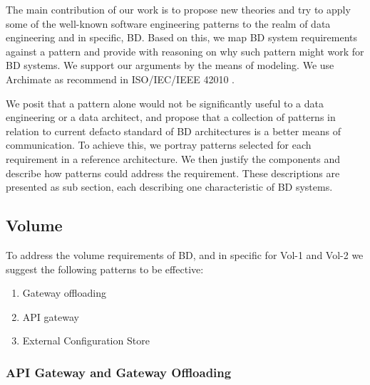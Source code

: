 \documentclass{bmcart}
\begin{document}
The main contribution of our work is to propose new theories and try to apply some of the well-known software engineering patterns to the realm of data engineering and in specific, BD. Based on this, we map BD system requirements against a pattern and provide with reasoning on why such pattern might work for BD systems. We support our arguments by the means of modeling. We use Archimate \cite{lankhorst2013language} as recommend in ISO/IEC/IEEE 42010 \cite{Chaabane}. 


We posit that a pattern alone would not be significantly useful to a data engineering or a data architect, and propose that a collection of patterns in relation to current defacto standard of BD architectures is a better means of communication. To achieve this, we portray patterns selected for each requirement in a reference architecture. We then justify the components and describe how patterns could address the requirement. These descriptions are presented as sub section, each describing one characteristic of BD systems. 


\subsection{Volume} \label{volume}


To address the volume requirements of BD, and in specific for Vol-1 and Vol-2 we suggest the following patterns to be effective:

\begin{enumerate}
  \item Gateway offloading
  \item API gateway
  \item External Configuration Store
\end{enumerate}

\subsubsection{API Gateway and Gateway Offloading}
\end{document}

